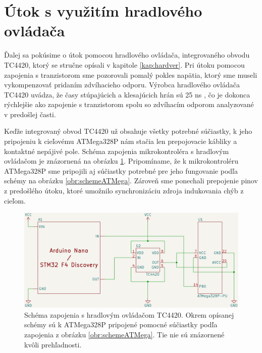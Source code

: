 \section{Útok s využitím hradlového ovládača}
Ďalej sa pokúsime o útok pomocou hradlového ovládača, integrovaného obvodu TC4420, ktorý se stručne opísali v kapitole \ref{kap:hardver}. Pri útoku pomocou zapojenia s tranzistorom sme pozorovali pomalý pokles napätia, ktorý sme museli vykompenzovať pridaním zdvíhacieho odporu. Výrobca hradlového ovládača TC4420 uvádza, že časy stúpajúcich a klesajúcich hrán sú 25 ns \cite{gateDriver}, čo je dokonca rýchlejšie ako zapojenie s tranzistorom spolu so zdvíhacím odporom analyzované v predošlej časti.

Keďže integrovaný obvod TC4420 už obsahuje všetky potrebné súčiastky, k jeho pripojeniu k cieľovému ATMega328P nám stačia len prepojovacie kábliky a kontaktné nepájivé pole. Schéma zapojenia mikrokontroléra s hradlovým ovládačom je znázornená na obrázku \ref{obr:schemeGateDriver}. Pripomíname, že k mikrokontroléru ATMega328P sme pripojili aj súčiastky potrebné pre jeho fungovanie podľa schémy na obrázku \ref{obr:schemeATMega}. Zároveň sme ponechali prepojenie pinov z predošlého útoku, ktoré umožnilo synchronizáciu zdroja indukovania chýb z cieľom.

\begin{figure}
    \centerline{\includegraphics[width=1\textwidth]{images/schemeGateDriver.png}}
    \caption[Schéma zapojenia s hradlovým ovládačom TC4420]{Schéma zapojenia s hradlovým ovládačom TC4420. Okrem opísanej schémy sú k ATMega328P pripojené pomocné súčiastky podľa zapojenia z obrázku \ref{obr:schemeATMega}. Tie nie sú znázornené kvôli prehľadnosti.}
    \label{obr:schemeGateDriver}
\end{figure}

